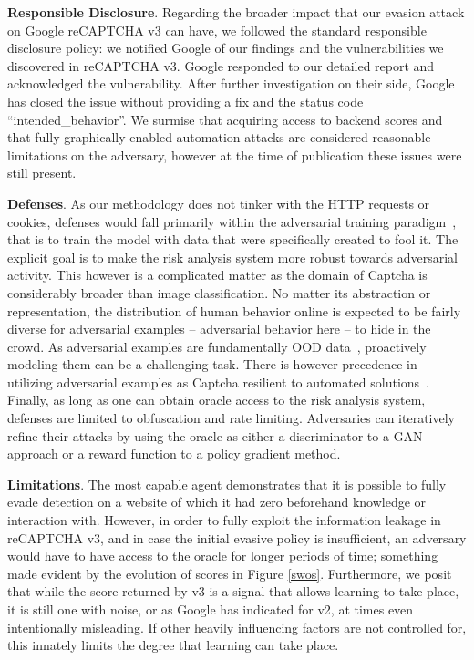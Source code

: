 \textbf{Responsible Disclosure}.
Regarding the broader impact that our evasion attack on Google reCAPTCHA v3 can have, we followed the standard responsible disclosure policy: we notified Google of our findings and the vulnerabilities we discovered in reCAPTCHA v3.
Google responded to our detailed report and acknowledged the vulnerability.
After further investigation on their side, Google has closed the issue without providing a fix and the status code ``intended\_behavior''.
We surmise that acquiring access to backend scores and that fully graphically enabled automation attacks are considered reasonable limitations on the adversary, however at the time of publication these issues were still present.

\textbf{Defenses}. As our methodology does not tinker with the HTTP requests or cookies, defenses would fall primarily within the adversarial training paradigm~\cite{tramer2017ensemble}, that is to train the model with data that were specifically created to fool it.
The explicit goal is to make the risk analysis system more robust towards adversarial activity.
This however is a complicated matter as the domain of Captcha is considerably broader than image classification.
No matter its abstraction or representation, the distribution of human behavior online is expected to be fairly diverse for adversarial examples -- adversarial behavior here -- to hide in the crowd.
As adversarial examples are fundamentally \gls{OOD} data~\cite{geirhos2020shortcut}, proactively modeling them can be a challenging task.
There is however precedence in utilizing adversarial examples as Captcha resilient to automated solutions~\cite{osadchy2017no}.
Finally, as long as one can obtain oracle access to the risk analysis system, defenses are limited to obfuscation and rate limiting.
Adversaries can iteratively refine their attacks by using the oracle as either a discriminator to a \gls{GAN} approach or a reward function to a policy gradient method.

\textbf{Limitations}. The most capable agent demonstrates that it is possible to fully evade detection on a website of which it had zero beforehand knowledge or interaction with.
However, in order to fully exploit the information leakage in reCAPTCHA v3, and in case the initial evasive policy is insufficient, an adversary would have to have access to the oracle for longer periods of time; something made evident by the evolution of scores in Figure \ref{swos}.
Furthermore, we posit that while the score returned by v3 is a signal that allows learning to take place, it is still one with noise, or as Google has indicated for v2, at times even intentionally misleading.
If other heavily influencing factors are not controlled for, this innately limits the degree that learning can take place.

